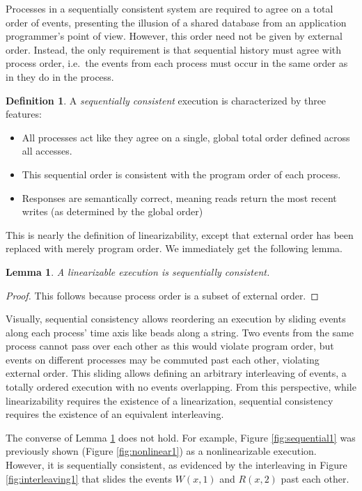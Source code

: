 \documentclass[]             %
{NASA}                       %
\newtheorem{lemma}[theorem]{Lemma}
\theoremstyle{definition}
\newtheorem{definition}{Definition}[section]
\begin{document}
Processes in a sequentially consistent system are required to agree on a
total order of events, presenting the illusion of a shared database from
an application programmer's point of view. However, this order need not
be given by external order. Instead, the only requirement is that
sequential history must agree with process order, i.e.~the events from
each process must occur in the same order as in they do in the process.

\begin{definition}
\label{def:sequentiallyconsistent}
A \emph{sequentially consistent} execution is
characterized by three features:
\begin{itemize}
\item All processes act like they agree on a single, global total order
  defined across all accesses.
\item This sequential order is consistent with the program order of each process.
\item Responses are semantically correct, meaning reads return the most recent writes (as determined by the global order)
\end{itemize}
\end{definition}

This is nearly the definition of linearizability, except that external
order has been replaced with merely program order. We immediately get
the following lemma.

\begin{lemma}
\label{lem:linearsequential}
    A linearizable execution is sequentially consistent.
\end{lemma}
\begin{proof}
This follows because process order is a subset of external order.
\end{proof}

Visually, sequential consistency allows reordering an execution by
sliding events along each process' time axis like beads along a string.
Two events from the same process cannot pass over each other as this
would violate program order, but events on different processes may be
commuted past each other, violating external order. This sliding allows
defining an arbitrary interleaving of events, a totally ordered
execution with no events overlapping. From this perspective, while
linearizability requires the existence of a linearization, sequential
consistency requires the existence of an equivalent interleaving.

The converse of Lemma \ref{lem:linearsequential} does not hold. For
example, Figure \ref{fig:sequential1} was previously shown (Figure
\ref{fig:nonlinear1}) as a nonlinearizable execution. However, it is
sequentially consistent, as evidenced by the interleaving in Figure
\ref{fig:interleaving1} that slides the events \(W(x,1)\) and \(R(x,2)\)
past each other.
\end{document}
